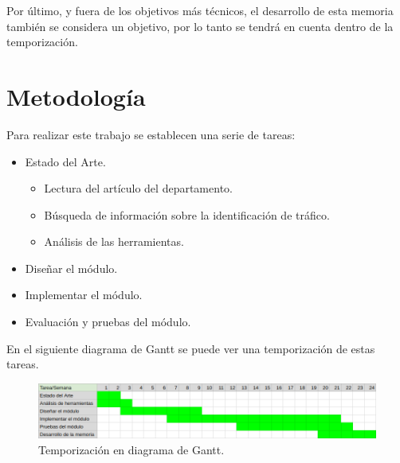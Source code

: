 \intro Por último, y fuera de los objetivos más técnicos, el desarrollo de esta memoria también se considera un objetivo, por 
lo tanto se tendrá en cuenta dentro de la temporización.

\section{Metodología}

Para realizar este trabajo se establecen una serie de tareas:

\begin{itemize}
\item Estado del Arte.
	\begin{itemize}
	\item Lectura del artículo del departamento. \cite{comparacion}
	\item Búsqueda de información sobre la identificación de tráfico.
	\item Análisis de las herramientas.
	\end{itemize}
\item Diseñar el módulo.
\item Implementar el módulo.
\item Evaluación y pruebas del módulo.
\end{itemize}

\intro En el siguiente diagrama de Gantt se puede ver una temporización de estas tareas. 

\begin{figure}[H]
  \includegraphics[width=1\textwidth]{imagenes/temporizacion.png} 
  \centering
  \caption{Temporización en diagrama de Gantt.}
\end{figure}

